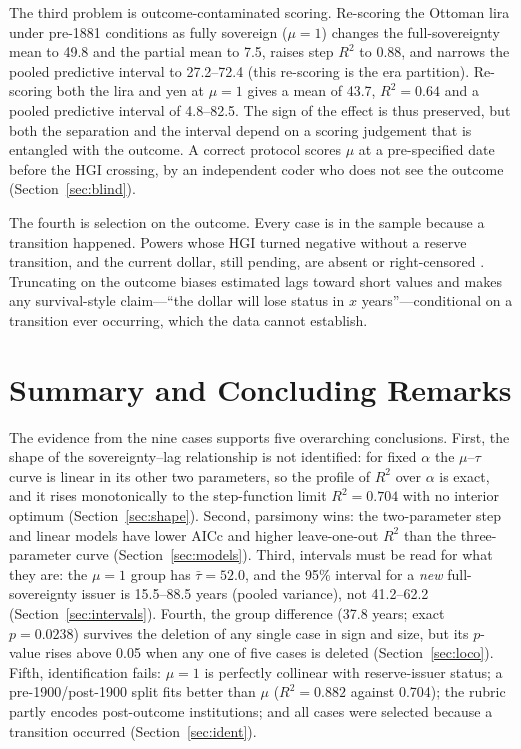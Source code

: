 \documentclass[11pt,letterpaper]{article}
\theoremstyle{definition}
\theoremstyle{plain}
\begin{document}
The third problem is outcome-contaminated scoring. Re-scoring the Ottoman lira under pre-1881 conditions as fully sovereign ($\mu=1$) changes the full-sovereignty mean to 49.8 and the partial mean to 7.5, raises step $R^2$ to 0.88, and narrows the pooled predictive interval to 27.2--72.4 (this re-scoring is the era partition). Re-scoring both the lira and yen at $\mu=1$ gives a mean of 43.7, $R^2=0.64$ and a pooled predictive interval of 4.8--82.5. The sign of the effect is thus preserved, but both the separation and the interval depend on a scoring judgement that is entangled with the outcome. A correct protocol scores $\mu$ at a pre-specified date before the HGI crossing, by an independent coder who does not see the outcome (Section~\ref{sec:blind}).

The fourth is selection on the outcome. Every case is in the sample because a transition happened. Powers whose HGI turned negative without a reserve transition, and the current dollar, still pending, are absent or right-censored \citep{geddes1990,king2001}. Truncating on the outcome biases estimated lags toward short values and makes any survival-style claim---``the dollar will lose status in $x$ years''---conditional on a transition ever occurring, which the data cannot establish.

\section{Summary and Concluding Remarks}\label{sec:conclusion}
The evidence from the nine cases supports five overarching conclusions. First, the shape of the sovereignty--lag relationship is not identified: for fixed $\alpha$ the $\mu$--$\tau$ curve is linear in its other two parameters, so the profile of $R^2$ over $\alpha$ is exact, and it rises monotonically to the step-function limit $R^2=0.704$ with no interior optimum (Section~\ref{sec:shape}). Second, parsimony wins: the two-parameter step and linear models have lower AICc and higher leave-one-out $R^2$ than the three-parameter curve (Section~\ref{sec:models}). Third, intervals must be read for what they are: the $\mu=1$ group has $\bar\tau=52.0$, and the 95\% interval for a \emph{new} full-sovereignty issuer is 15.5--88.5 years (pooled variance), not 41.2--62.2 (Section~\ref{sec:intervals}). Fourth, the group difference (37.8 years; exact $p=0.0238$) survives the deletion of any single case in sign and size, but its $p$-value rises above 0.05 when any one of five cases is deleted (Section~\ref{sec:loco}). Fifth, identification fails: $\mu=1$ is perfectly collinear with reserve-issuer status; a pre-1900/post-1900 split fits better than $\mu$ ($R^2=0.882$ against 0.704); the rubric partly encodes post-outcome institutions; and all cases were selected because a transition occurred (Section~\ref{sec:ident}).
\end{document}
